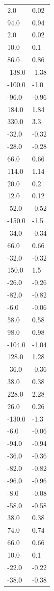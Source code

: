 \begin{longtable}{ll}
2.0 & 0.02 \\
94.0 & 0.94 \\
2.0 & 0.02 \\
10.0 & 0.1 \\
86.0 & 0.86 \\
-138.0 & -1.38 \\
-100.0 & -1.0 \\
-96.0 & -0.96 \\
184.0 & 1.84 \\
330.0 & 3.3 \\
-32.0 & -0.32 \\
-28.0 & -0.28 \\
66.0 & 0.66 \\
114.0 & 1.14 \\
20.0 & 0.2 \\
12.0 & 0.12 \\
-52.0 & -0.52 \\
-150.0 & -1.5 \\
-34.0 & -0.34 \\
66.0 & 0.66 \\
-32.0 & -0.32 \\
150.0 & 1.5 \\
-26.0 & -0.26 \\
-82.0 & -0.82 \\
-6.0 & -0.06 \\
58.0 & 0.58 \\
98.0 & 0.98 \\
-104.0 & -1.04 \\
128.0 & 1.28 \\
-36.0 & -0.36 \\
38.0 & 0.38 \\
228.0 & 2.28 \\
26.0 & 0.26 \\
-130.0 & -1.3 \\
-6.0 & -0.06 \\
-94.0 & -0.94 \\
-36.0 & -0.36 \\
-82.0 & -0.82 \\
-96.0 & -0.96 \\
-8.0 & -0.08 \\
-58.0 & -0.58 \\
38.0 & 0.38 \\
74.0 & 0.74 \\
66.0 & 0.66 \\
10.0 & 0.1 \\
-22.0 & -0.22 \\
-38.0 & -0.38 \\

\end{longtable}
